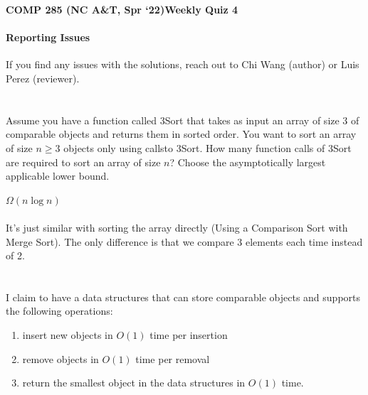 \documentclass [12pt]{article}
\begin{document}
 

{\LARGE \textbf {COMP 285 (NC A\&T, Spr `22)}\hfill \textbf {Weekly Quiz 4} } 

\begin{Instruction}

\paragraph{Reporting Issues} If you find any issues with the solutions, reach out to Chi Wang (author) or Luis Perez (reviewer).

\end{Instruction}


\section{} Assume you have a function called 3Sort that takes as input an array of size 3 of comparable objects and returns them in sorted order. You want to sort an array of size $n \geq 3$ objects only using callsto 3Sort. How many function calls of 3Sort are required to sort an array of size $n$? Choose the asymptotically largest applicable lower bound.

\begin{Solution}
$\Omega(n \log n)$
\paragraph{} 
It's just similar with sorting the array directly (Using a Comparison Sort with Merge Sort). The only difference is that we compare 3 elements each time instead of 2.
\paragraph{} 


\end{Solution}


\section{} I claim to have a data structures that can store comparable objects and supports the following operations: 
\begin{enumerate}
    \item insert new objects in $O(1)$ time per insertion
    \item remove objects in $O(1)$ time per removal
    \item return the smallest object in the data structures in $O(1)$ time. 
\end{enumerate}
\end{document}
